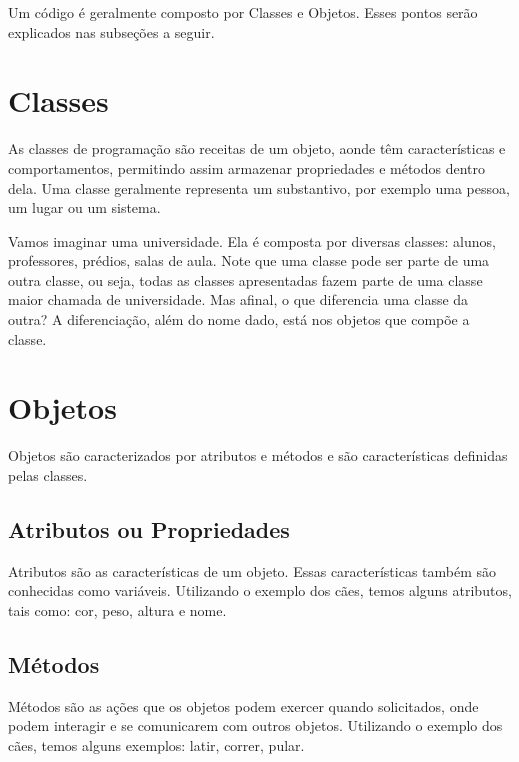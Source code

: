 \documentclass[
]{book}
\begin{document}
Um código é geralmente composto por Classes e Objetos. Esses pontos serão explicados nas subseções a seguir.

\hypertarget{classes}{%
\section{Classes}\label{classes}}

As classes de programação são receitas de um objeto, aonde têm características e comportamentos, permitindo assim armazenar propriedades e métodos dentro dela. Uma classe geralmente representa um substantivo, por exemplo uma pessoa, um lugar ou um sistema.

Vamos imaginar uma universidade. Ela é composta por diversas classes: alunos, professores, prédios, salas de aula. Note que uma classe pode ser parte de uma outra classe, ou seja, todas as classes apresentadas fazem parte de uma classe maior chamada de universidade. Mas afinal, o que diferencia uma classe da outra? A diferenciação, além do nome dado, está nos objetos que compõe a classe.

\hypertarget{objetos}{%
\section{Objetos}\label{objetos}}

Objetos são caracterizados por atributos e métodos e são características definidas pelas classes.

\hypertarget{atributos-ou-propriedades}{%
\subsection{Atributos ou Propriedades}\label{atributos-ou-propriedades}}

Atributos são as características de um objeto. Essas características também são conhecidas como variáveis. Utilizando o exemplo dos cães, temos alguns atributos, tais como: cor, peso, altura e nome.

\hypertarget{muxe9todos}{%
\subsection{Métodos}\label{muxe9todos}}

Métodos são as ações que os objetos podem exercer quando solicitados, onde podem interagir e se comunicarem com outros objetos. Utilizando o exemplo dos cães, temos alguns exemplos: latir, correr, pular.
\end{document}
